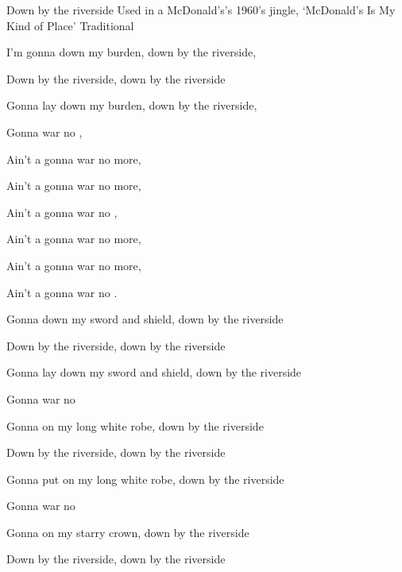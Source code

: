 \begin{SBSong}{Down by the riverside}
  {Used in a McDonald's's 1960's jingle, `McDonald's Is My Kind of Place'}
  {Traditional}
  \begin{SBVerse}
    I'm gonna  down my burden, down by the riverside,
    
    Down by the riverside, down by the riverside

    Gonna lay down my burden, down by the riverside,

    Gonna  war no , 
  \end{SBVerse}
  \begin{SBChorus}
    Ain't a gonna  war no more, 

    Ain't a gonna  war no more,

    Ain't a gonna  war no , 

    Ain't a gonna  war no more,

    Ain't a gonna  war no more, 

    Ain't a gonna  war no .  
  \end{SBChorus}
  \begin{SBVerse}
    Gonna  down my sword and shield,  down by the riverside

    Down by the riverside, down by the riverside

    Gonna lay down my sword and shield, down by the riverside

    Gonna  war no  
  \end{SBVerse}
  \begin{SBVerse}
    Gonna  on my long white robe, down by the riverside

    Down by the riverside, down by the riverside

    Gonna put on my long white robe, down by the riverside

    Gonna  war no  
  \end{SBVerse}
  \begin{SBVerse}
    Gonna  on my starry crown, down by the riverside

    Down by the riverside, down by the riverside
    

\end{SBVerse}
\end{SBSong}
